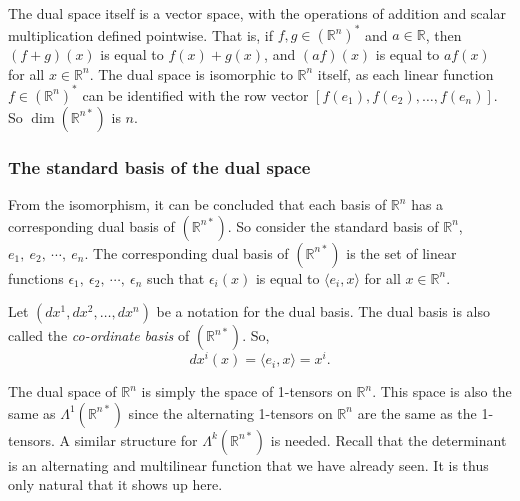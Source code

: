\documentclass{article}
\begin{document}
\noindent The dual space itself is a vector space, with the operations of addition and scalar multiplication defined pointwise. That is, if $f, g \in (\mathbb{R}^n)^*$ and $a \in \mathbb{R}$, then $(f + g)(x) $ is equal to $ f(x) + g(x)$, and $(af)(x)$ is equal to $a f(x)$ for all $x \in \mathbb{R}^n$. The dual space is isomorphic to $\mathbb{R}^n$ itself, as each linear function  $f \in (\mathbb{R}^n)^*$ can be identified with the row vector $[f(e_1), f(e_2), \ldots, f(e_n)]$. So $\dim (\mathbb{R}^{n*})$ is $n$.

\subsubsection{The standard basis of the dual space}
From the isomorphism, it can be concluded that each basis of $\mathbb{R}^n$ has a corresponding dual basis of $(\mathbb{R}^{n*})$. So consider the standard basis of $\mathbb{R}^n$, $e_1,\  e_2, \ \cdots, \ e_n$. The corresponding dual basis of $(\mathbb{R}^{n*})$ is the set of linear functions $\epsilon_1, \ \epsilon_2, \ \cdots, \ \epsilon_n$ such that $\epsilon_i(x) $ is equal to $ \langle e_i, x \rangle$ for all $x \in \mathbb{R}^n$. 

\noindent Let $(dx^1, dx^2, \ldots, dx^n)$ be a notation for the dual basis. The dual basis is also called the \textit{co-ordinate basis} of $(\mathbb{R}^{n*})$. So,
$$dx^i(x) = \langle e_i, x \rangle = x^i .$$ 

The dual space of $\mathbb{R}^n$ is simply the space of 1-tensors on $\mathbb{R}^n$. This space is also the same as $\Lambda^1(\mathbb{R}^{n*})$ since the alternating 1-tensors on $\mathbb{R}^n$ are the same as the 1-tensors.
A similar structure for $\Lambda^k(\mathbb{R}^{n*})$ is needed. Recall that the determinant is an alternating and multilinear function that we have already seen. It is thus only natural that it shows up here. 
\end{document}
